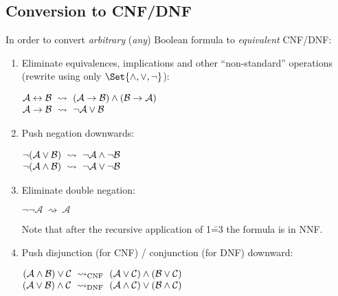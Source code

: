 \documentclass[a4paper,10pt]{article}
\begin{document}
\subsection{Conversion to CNF/DNF}

In order to convert \emph{arbitrary} (\ie \emph{any}) Boolean formula to \emph{equivalent} CNF/DNF:
\begin{enumerate}[topsep=2pt, itemsep=2pt]
    \item Eliminate equivalences, implications and other \enquote{non-standard} operations (\ie rewrite using only $\Set{\land, \lor, \neg}$):
    \par\(\openup-\jot\begin{aligned}[t]
        \mathcal{A} \iff \mathcal{B} &~\rightsquigarrow~ (\mathcal{A} \implies \mathcal{B}) \land (\mathcal{B} \implies \mathcal{A}) \\
        \mathcal{A} \implies \mathcal{B} &~\rightsquigarrow~ \neg\mathcal{A} \lor \mathcal{B}
    \end{aligned}\)

    \item Push negation downwards:
    \par\(\openup-\jot\begin{aligned}[t]
        \neg(\mathcal{A} \lor \mathcal{B}) &~\rightsquigarrow~ \neg\mathcal{A} \land \neg\mathcal{B} \\
        \neg(\mathcal{A} \land \mathcal{B}) &~\rightsquigarrow~ \neg\mathcal{A} \lor \neg\mathcal{B}
    \end{aligned}\)

    \item Eliminate double negation:
    \par$\neg\neg\mathcal{A} ~\rightsquigarrow~ \mathcal{A}$

    Note that after the recursive application of 1\==3 the formula is in NNF.

    \item Push disjunction (for CNF) / conjunction (for DNF) downward:
    \par\(\openup-\jot\begin{aligned}[t]
        (\mathcal{A} \land \mathcal{B}) \lor \mathcal{C} ~\rightsquigarrow_{\textrm{CNF}}~ (\mathcal{A} \lor \mathcal{C}) \land (\mathcal{B} \lor \mathcal{C}) \\
        (\mathcal{A} \lor \mathcal{B}) \land \mathcal{C} ~\rightsquigarrow_{\textrm{DNF}}~ (\mathcal{A} \land \mathcal{C}) \lor (\mathcal{B} \land \mathcal{C}) \\
    \end{aligned}\)


\end{enumerate}
\end{document}
